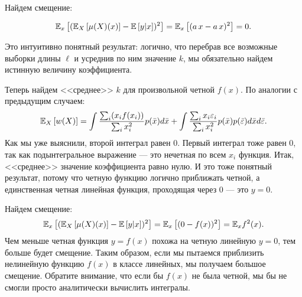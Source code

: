\documentclass[12pt,fleqn]{article}
\begin{document}
\begin{esSolution}
    Найдем смещение:

    $$
    \mathbb{E}_{x}\left[(\mathbb{E}_{X}\left[\mu(X)(x)\right] - \mathbb{E}\left[y|x\right] )^2\right] = \mathbb{E}_{x}\left[(a\,x -  a\, x )^2\right] = 0.
    $$

    Это интуитивно понятный результат: логично, что перебрав все возможные выборки длины $\ell$ и усреднив по ним значение $k$, мы обязательно найдем истинную величину коэффициента.
    
    Теперь найдем <<среднее>> $k$ для произвольной четной  $f(x)$.
    По аналогии с предыдущим случаем:
    $$
    \mathbb{E}_{X}\left[w(X)\right] = 
    \int \dfrac{\sum_i ( x_i f(x_i)) }{\sum_i x_i^2}  p(\bar x)  d\bar x
    +
    \int \dfrac{\sum_i x_i \varepsilon_i}{\sum_i x_i^2}  p(\bar x)  p(\bar \varepsilon)  d \bar x d \bar \varepsilon.
    $$
    Как мы уже выяснили, второй интеграл равен 0.
    Первый интеграл тоже равен 0, так как подынтегральное выражение --- это нечетная по всем $x_i$ функция.
    Итак, <<среднее>> значение коэффициента равно нулю.
    И это тоже понятный результат, потому что четную функцию логично приближать четной, а единственная четная линейная функция, проходящая через 0 --- это $y = 0$.
    
    Найдем смещение:
    $$
    \mathbb{E}_{x}\left[(\mathbb{E}_{X}\left[\mu(X)(x)\right] - \mathbb{E}\left[y|x\right] )^2\right]
    =
    \mathbb{E}_{x}\left[(0 -  f(x))^2\right]
    =
    \mathbb{E}_x f^2(x).
    $$
    Чем меньше четная функция $y=f(x)$ похожа на четную линейную $y = 0$, тем больше будет смещение.
    Таким образом, если мы пытаемся приблизить нелинейную функцию $f(x)$ в классе линейных, мы получаем большое смещение.
    Обратите внимание, что если бы $f(x)$ не была четной, мы бы не смогли просто аналитически вычислить интегралы.
\end{esSolution}
\end{document}
